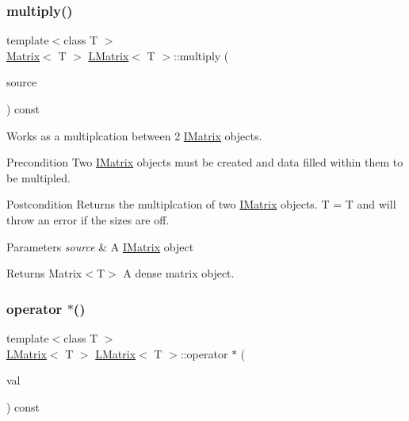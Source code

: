 \subsubsection{\texorpdfstring{multiply()}{multiply()}\hspace{0.1cm}{\footnotesize\ttfamily [6/6]}}
{\footnotesize\ttfamily template$<$class T $>$ \\
\mbox{\hyperlink{class_matrix}{Matrix}}$<$ T $>$ \mbox{\hyperlink{class_l_matrix}{L\+Matrix}}$<$ T $>$\+::multiply (\begin{DoxyParamCaption}\item[{const \mbox{\hyperlink{class_i_matrix}{I\+Matrix}}$<$ \mbox{\hyperlink{class_d_matrix}{D\+Matrix}}$<$ T $>$, T $>$ \&}]{source }\end{DoxyParamCaption}) const}



Works as a multiplcation between 2 \mbox{\hyperlink{class_i_matrix}{I\+Matrix}} objects. 

\begin{DoxyPrecond}{Precondition}
Two \mbox{\hyperlink{class_i_matrix}{I\+Matrix}} objects must be created and data filled within them to be multipled. 
\end{DoxyPrecond}
\begin{DoxyPostcond}{Postcondition}
Returns the multiplcation of two \mbox{\hyperlink{class_i_matrix}{I\+Matrix}} objects. T = T and will throw an error if the sizes are off.
\end{DoxyPostcond}

\begin{DoxyParams}{Parameters}
{\em source} & A \mbox{\hyperlink{class_i_matrix}{I\+Matrix}} object \\
\hline
\end{DoxyParams}
\begin{DoxyReturn}{Returns}
Matrix$<$\+T$>$ A dense matrix object. 
\end{DoxyReturn}
\mbox{\label{class_l_matrix_ac8df9082c434b41a98d26defb95ea388}} 
\subsubsection{\texorpdfstring{operator $\ast$()}{operator *()}}
{\footnotesize\ttfamily template$<$class T $>$ \\
\mbox{\hyperlink{class_l_matrix}{L\+Matrix}}$<$ T $>$ \mbox{\hyperlink{class_l_matrix}{L\+Matrix}}$<$ T $>$\+::operator $\ast$ (\begin{DoxyParamCaption}\item[{const T \&}]{val }\end{DoxyParamCaption}) const\hspace{0.3cm}{\ttfamily [virtual]}}



